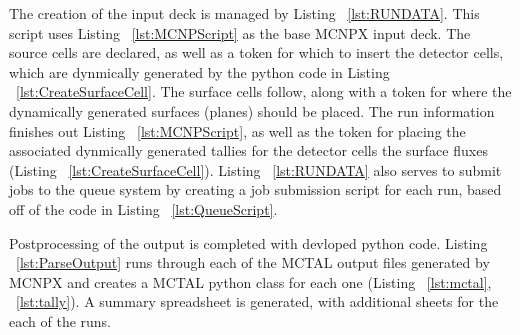 
The creation of the input deck is managed by Listing ~\ref{lst:RUNDATA}.
This script uses Listing ~\ref{lst:MCNPScript} as the base MCNPX input deck.
The source cells are declared, as well as a token for which to insert the detector cells, which are dynmically generated by the python code in Listing ~\ref{lst:CreateSurfaceCell}.
The surface cells follow, along with a token for where the dynamically generated surfaces (planes) should be placed.
The run information finishes out Listing ~\ref{lst:MCNPScript}, as well as the token for placing the associated dynmically generated tallies for the detector cells the surface fluxes (Listing ~\ref{lst:CreateSurfaceCell}).
Listing ~\ref{lst:RUNDATA} also serves to submit jobs to the queue system by creating a job submission script for each run, based off of the code in Listing ~\ref{lst:QueueScript}.

Postprocessing of the output is completed with devloped python code.
Listing ~\ref{lst:ParseOutput} runs through each of the MCTAL output files generated by MCNPX and creates a MCTAL python class for each one (Listing ~\ref{lst:mctal}, ~\ref{lst:tally}).
A summary spreadsheet is generated, with additional sheets for the each of the runs.










